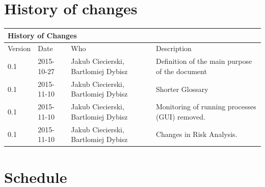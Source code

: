 \documentclass{article}
\begin{document}
\section*{History of changes}


\begin{center}

\begin{table}[h]
\hspace*{-1.1cm}
\large
\begin{tabular}{|l|l|l|l|}
\hline
\multicolumn{4}{|l|}{\cellcolor[HTML]{C0C0C0}History of Changes} \\ \hline
Version         & Date         & Who        & Description        

\\ \hline

0.1         
& 2015-10-27         
& Jakub Ciecierski, Bartlomiej Dybisz
& Definition of the main purpose of the document      

\\ \hline

0.1         
& 2015-11-10         
& Jakub Ciecierski, Bartlomiej Dybisz
& Shorter Glossary


\\ \hline

0.1         
& 2015-11-10         
& Jakub Ciecierski, Bartlomiej Dybisz
& Monitoring of running processes (GUI) removed.


\\ \hline

0.1         
& 2015-11-10         
& Jakub Ciecierski, Bartlomiej Dybisz
& Changes in Risk Analysis.


\\ \hline
\end{tabular}
\end{table}


\end{center}

\section*{Schedule}
\end{document}
